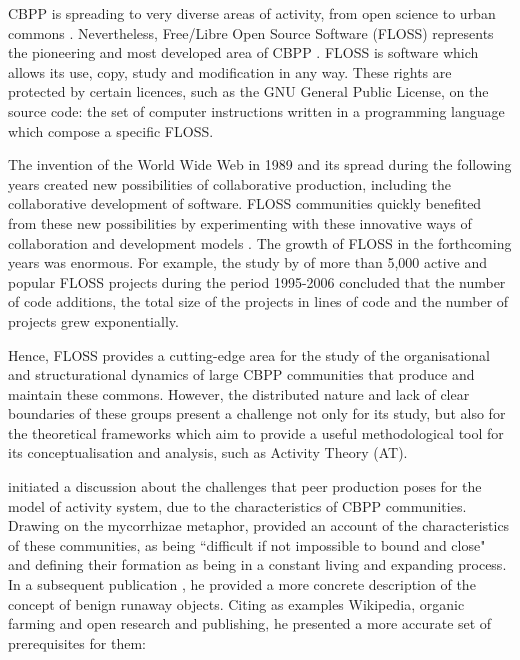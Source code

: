 \documentclass[a4paper, 12pt]{article}
\begin{document}
CBPP is spreading to very diverse areas of activity, from open science to urban commons \parencite[121-124]{Fuster2014}. Nevertheless, Free/Libre Open Source Software (FLOSS) represents the pioneering and most developed area of CBPP \parencite[121]{Fuster2014}. FLOSS is software which allows its use, copy, study and modification in any way. These rights are protected by certain licences, such as the GNU General Public License, on the source code: the set of computer instructions written in a programming language which compose a specific FLOSS.

The invention of the World Wide Web in 1989 \parencite{berners1992world} and its spread during the following years created new possibilities of collaborative production, including the collaborative development of software. FLOSS communities quickly benefited from these new possibilities by experimenting with these innovative ways of collaboration and development models \parencite{kelty2008two-linux}. The growth of FLOSS in the forthcoming years was enormous. For example, the study by \textcite{deshpande2008total} of more than 5,000 active and popular FLOSS projects during the period 1995-2006 concluded that the number of code additions, the total size of the projects in lines of code and the number of projects grew exponentially.

Hence, FLOSS provides a cutting-edge area for the study of the organisational and structurational dynamics of large CBPP communities that produce and maintain these commons. However, the distributed nature and lack of clear boundaries of these groups present a challenge not only for its study, but also for the theoretical frameworks which aim to provide a useful methodological tool for its conceptualisation and analysis, such as Activity Theory (AT).

\textcite{engestrom2007communities} initiated a discussion about the challenges that peer production poses for the model of activity system, due to the characteristics of CBPP communities. Drawing on the mycorrhizae metaphor, \textcite[10-11]{engestrom2007communities} provided an account of the characteristics of these communities, as being ``difficult if not impossible to bound and close" and defining their formation as being in a constant living and expanding process. In a subsequent publication \parencite{engestrom_future_2009}, he provided a more concrete description of the concept of benign runaway objects. Citing as examples Wikipedia, organic farming and open research and publishing, he presented a more accurate set of prerequisites for them:
\end{document}
